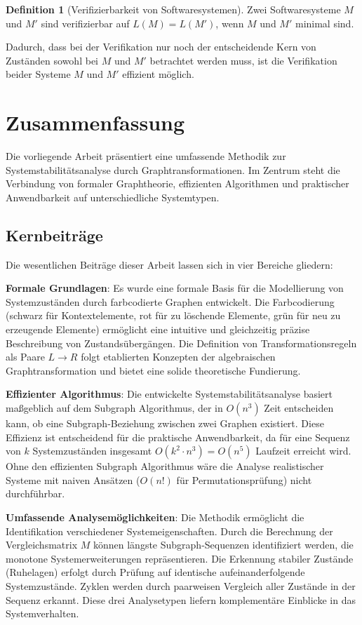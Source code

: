 \documentclass[a4paper,12pt]{article}
\theoremstyle{definition}
\newtheorem{definition}{Definition}
\begin{document}
\begin{definition}[Verifizierbarkeit von Softwaresystemen]
	Zwei Softwaresysteme $M$ und $M'$ sind verifizierbar auf $L(M) = L(M')$, wenn $M$ und $M'$ minimal sind.
\end{definition}
Dadurch, dass bei der Verifikation nur noch der entscheidende Kern von Zuständen sowohl bei $M$ und $M'$ betrachtet werden muss, ist die Verifikation beider Systeme $M$ und $M'$ effizient möglich.

\section{Zusammenfassung}

Die vorliegende Arbeit präsentiert eine umfassende Methodik zur Systemstabilitätsanalyse durch Graphtransformationen. Im Zentrum steht die Verbindung von formaler Graphtheorie, effizienten Algorithmen und praktischer Anwendbarkeit auf unterschiedliche Systemtypen.

\subsection{Kernbeiträge}

Die wesentlichen Beiträge dieser Arbeit lassen sich in vier Bereiche gliedern:

\textbf{Formale Grundlagen}: Es wurde eine formale Basis für die Modellierung von Systemzuständen durch farbcodierte Graphen entwickelt. Die Farbcodierung (schwarz für Kontextelemente, rot für zu löschende Elemente, grün für neu zu erzeugende Elemente) ermöglicht eine intuitive und gleichzeitig präzise Beschreibung von Zustandsübergängen. Die Definition von Transformationsregeln als Paare $L \rightarrow R$ folgt etablierten Konzepten der algebraischen Graphtransformation und bietet eine solide theoretische Fundierung.

\textbf{Effizienter Algorithmus}: Die entwickelte Systemstabilitätsanalyse basiert maßgeblich auf dem Subgraph Algorithmus, der in $O(n^3)$ Zeit entscheiden kann, ob eine Subgraph-Beziehung zwischen zwei Graphen existiert. Diese Effizienz ist entscheidend für die praktische Anwendbarkeit, da für eine Sequenz von $k$ Systemzuständen insgesamt $O(k^2 \cdot n^3) = O(n^5)$ Laufzeit erreicht wird. Ohne den effizienten Subgraph Algorithmus wäre die Analyse realistischer Systeme mit naiven Ansätzen ($O(n!)$ für Permutationsprüfung) nicht durchführbar.

\textbf{Umfassende Analysemöglichkeiten}: Die Methodik ermöglicht die Identifikation verschiedener Systemeigenschaften. Durch die Berechnung der Vergleichsmatrix $M$ können längste Subgraph-Sequenzen identifiziert werden, die monotone Systemerweiterungen repräsentieren. Die Erkennung stabiler Zustände (Ruhelagen) erfolgt durch Prüfung auf identische aufeinanderfolgende Systemzustände. Zyklen werden durch paarweisen Vergleich aller Zustände in der Sequenz erkannt. Diese drei Analysetypen liefern komplementäre Einblicke in das Systemverhalten.
\end{document}
